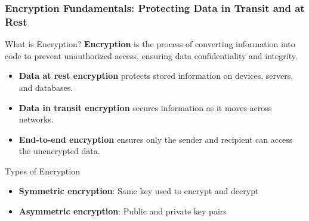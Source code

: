 \documentclass{beamer}
\begin{document}
\begin{frame}
    \frametitle{Encryption Fundamentals: Protecting Data in Transit and at Rest}
    
    \begin{block}{What is Encryption?}
    \textbf{Encryption} is the process of converting information into code to prevent unauthorized access, ensuring data confidentiality and integrity.
    \end{block}
    
    \begin{itemize}
    \item \textbf{Data at rest encryption} protects stored information on devices, servers, and databases.
    \item \textbf{Data in transit encryption} secures information as it moves across networks.
    \item \textbf{End-to-end encryption} ensures only the sender and recipient can access the unencrypted data.

    \end{itemize}
    
    \begin{alertblock}{Types of Encryption}
    \begin{itemize}
    \item \textbf{Symmetric encryption}: Same key used to encrypt and decrypt
    \item \textbf{Asymmetric encryption}: Public and private key pairs
    \end{itemize}
    \end{alertblock}
    \end{frame}
    
\end{document}
